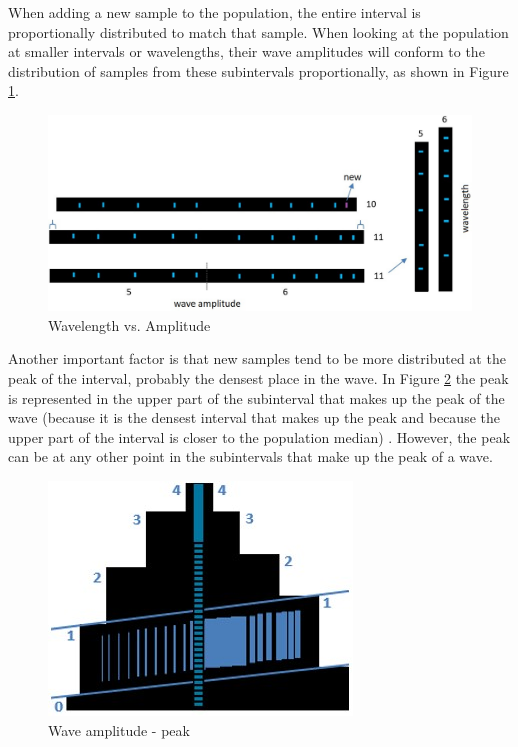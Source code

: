 When adding a new sample to the population, the entire interval is proportionally distributed to match that sample. When looking at the population at smaller intervals or wavelengths, their wave amplitudes will conform to the distribution of samples from these subintervals proportionally, as shown in Figure \ref{fig:consciousness_space_volume_amplitude}.
	\begin{figure}[H]
	\caption{Wavelength vs. Amplitude}
	\label{fig:consciousness_space_volume_amplitude}
	\centering
	\includegraphics[scale=.4]{sections/images/consciousness_space_volume_amplitude.jpg}
	\end{figure}
	
Another important factor is that new samples tend to be more distributed at the peak of the interval, probably the densest place in the wave. In Figure \ref{fig:consciousness_space_amplitude_growth} the peak is represented in the upper part of the subinterval that makes up the peak of the wave (because it is the densest interval that makes up the peak and because the upper part of the interval is closer to the population median) . However, the peak can be at any other point in the subintervals that make up the peak of a wave.
	\begin{figure}[H]
	\caption{Wave amplitude - peak}
	\label{fig:consciousness_space_amplitude_growth}
	\centering
	\includegraphics[scale=.6]{sections/images/consciousness_space_amplitude_growth.jpg}
	\end{figure}

